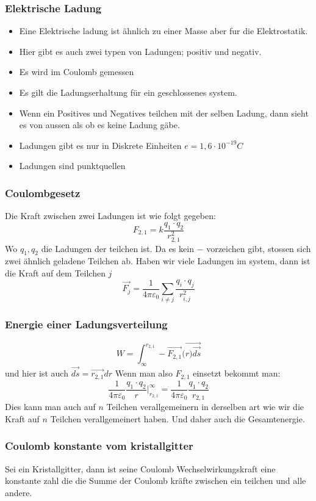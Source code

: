 \documentclass{article}
\begin{document}
\subsubsection{Elektrische Ladung}\begin{multicols}{2} \begin{itemize}\item{Eine Elektrische ladung ist ähnlich zu einer Masse aber fur die Elektrostatik.} \item{Hier gibt es auch zwei typen von Ladungen; positiv und negativ.} \item{Es wird im Coulomb gemessen} \item{Es gilt die Ladungserhaltung für ein geschlossenes system.} \item{Wenn ein Positives und Negatives teilchen mit der selben Ladung, dann sieht es von aussen als ob es keine Ladung gäbe.} \item{Ladungen gibt es nur in Diskrete Einheiten $e=1,6\cdot10^{-19}C$}\item{Ladungen sind punktquellen}\end{itemize}\end{multicols}
\subsubsection{Coulombgesetz} Die Kraft zwischen zwei Ladungen ist wie folgt gegeben:\[F_{2,1}=k\frac{q_1\cdot q_2}{r_{2,1}^2}\]Wo $q_1, q_2$ die Ladungen der teilchen ist. Da es kein $-$ vorzeichen gibt, stossen sich zwei ähnlich geladene Teilchen ab.
\newline Haben wir viele Ladungen im system, dann ist die Kraft auf dem Teilchen $j$ \[\vec{F_{j}}=\frac{1}{4\pi\varepsilon_0}\sum_{i\neq j}\frac{q_i\cdot q_j}{r_{i,j}^2}\]
\subsubsection{Energie einer Ladungsverteilung} \[W=\int_\infty^{r_{2,1}}-\vec{F_{2,1}}(\vec{r)\vec{ds}}\] und hier ist auch $\vec{ds}=\vec{r_{2,1}}dr$ Wenn man also $F_{2,1}$ einsetzt bekommt man:\[\frac{1}{4\pi\varepsilon_0}\frac{q_1\cdot q_2}{r}\left.\right|^\infty_{r_{2,1}}=\frac{1}{4\pi\varepsilon_0}\frac{q_1\cdot q_2}{r_{2,1}}\]
  Dies kann man auch auf $n$ Teilchen verallgemeinern in derselben art wie wir die Kraft auf $n$ Teilchen verallgemeinert haben. Und daher auch die Gesamtenergie.
\subsubsection{Coulomb konstante vom kristallgitter} Sei ein Kristallgitter, dann ist seine Coulomb Wechselwirkungskraft eine konstante zahl die die Summe der Coulomb kräfte zwischen ein teilchen und alle andere.
\end{document}
